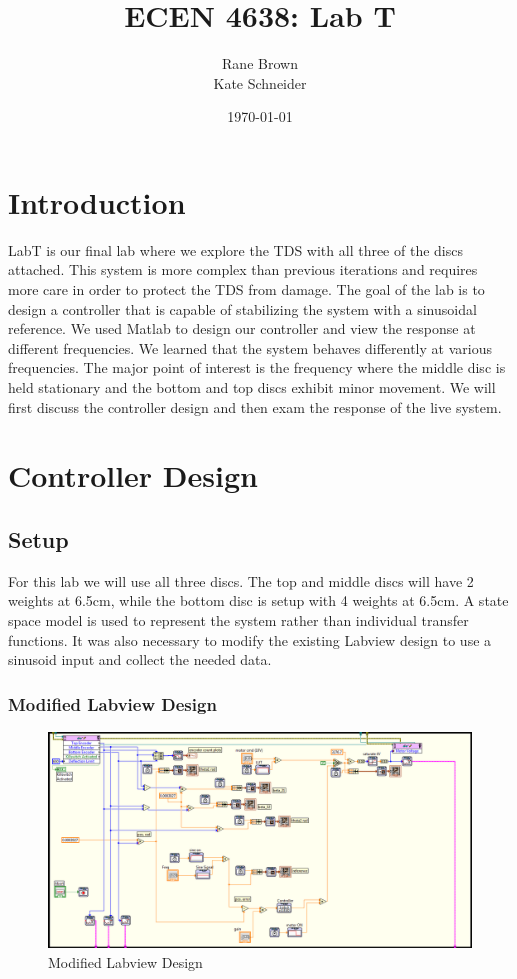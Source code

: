 \documentclass[11pt,titlepage]{article}
\author{Rane Brown \\ Kate Schneider}
\title{ECEN 4638: Lab T}
\date{\today}
\begin{document}
\maketitle
\tableofcontents
\listoffigures
\newpage

\section{Introduction}
    LabT is our final lab where we explore the TDS with all three of the discs attached. This system is more complex than previous iterations and requires more care in order to protect the TDS from damage. The goal of the lab is to design a controller that is capable of stabilizing the system with a sinusoidal reference. We used Matlab to design our controller and view the response at different frequencies. We learned that the system behaves differently at various frequencies. The major point of interest is the frequency where the middle disc is held stationary and the bottom and top discs exhibit minor movement. We will first discuss the controller design and then exam the response of the live system.

\section{Controller Design}
    \subsection{Setup}
        For this lab we will use all three discs. The top and middle discs will have 2 weights at 6.5cm, while the bottom disc is setup with 4 weights at 6.5cm. A state space model is used to represent the system rather than individual transfer functions. It was also necessary to modify the existing Labview design to use a sinusoid input and collect the needed data.
        \subsubsection{Modified Labview Design}
            \begin{figure}[H]
                    \centering
                    \includegraphics[scale=0.35]{labview}
                    \caption{Modified Labview Design}
                    \label{fig:labview}
            \end{figure}
\end{document}
